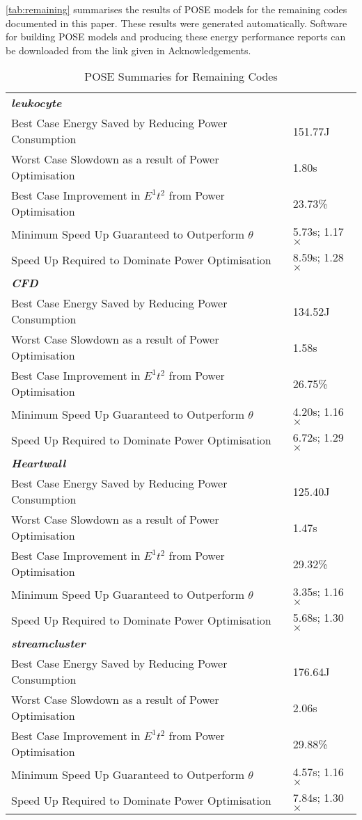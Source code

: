 \label{sec:appendix}
\autoref{tab:remaining} summarises the results of POSE models for the remaining codes documented in this paper.
These results were generated automatically.
Software for building POSE models and producing these energy performance reports can be downloaded from the link given in Acknowledgements.

\begin{table}[h!]
\caption{POSE Summaries for Remaining Codes}
\label{tab:remaining}
\begin{tabular}{@{}ll@{}}\toprule
 \textbf{\emph{leukocyte}}&\\
 Best Case Energy Saved by Reducing Power Consumption & 151.77J \\
 Worst Case Slowdown as a result of Power Optimisation & 1.80s \\
 Best Case Improvement in $E^1t^2$ from Power Optimisation & 23.73\% \\
 Minimum Speed Up Guaranteed to Outperform $\theta$ & 5.73s; 1.17$\times$ \\
 Speed Up Required to Dominate Power Optimisation & 8.59s; 1.28$\times$ \\
 \rule{0pt}{2.5ex}\textbf{\textit{CFD}}& \\
 Best Case Energy Saved by Reducing Power Consumption & 134.52J \\
 Worst Case Slowdown as a result of Power Optimisation & 1.58s \\
 Best Case Improvement in $E^1t^2$ from Power Optimisation & 26.75\% \\
 Minimum Speed Up Guaranteed to Outperform $\theta$ & 4.20s; 1.16$\times$ \\
 Speed Up Required to Dominate Power Optimisation & 6.72s; 1.29$\times$ \\
 \rule{0pt}{2.5ex}\textbf{\textit{Heartwall}}&\\
 Best Case Energy Saved by Reducing Power Consumption & 125.40J \\
 Worst Case Slowdown as a result of Power Optimisation & 1.47s \\
 Best Case Improvement in $E^1t^2$ from Power Optimisation & 29.32\% \\
 Minimum Speed Up Guaranteed to Outperform $\theta$ & 3.35s; 1.16$\times$ \\
 Speed Up Required to Dominate Power Optimisation & 5.68s; 1.30$\times$ \\
 \rule{0pt}{2.5ex}\textbf{\textit{streamcluster}}&\\
 Best Case Energy Saved by Reducing Power Consumption & 176.64J \\
 Worst Case Slowdown as a result of Power Optimisation & 2.06s \\
 Best Case Improvement in $E^1t^2$ from Power Optimisation & 29.88\% \\
 Minimum Speed Up Guaranteed to Outperform $\theta$ & 4.57s; 1.16$\times$ \\
 Speed Up Required to Dominate Power Optimisation & 7.84s; 1.30$\times$ \\
\bottomrule
\end{tabular}
\end{table}
